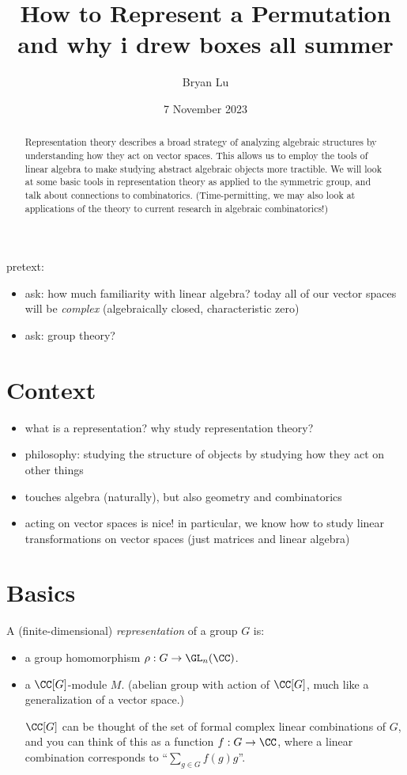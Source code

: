 \documentclass[12pt]{article}
\title{How to Represent a Permutation \\ \small{and why i drew boxes all summer}}
\author{Bryan Lu}
\date{7 November 2023} %
\begin{document}
\maketitle

\begin{abstract}
  Representation theory describes a broad strategy of analyzing
  algebraic structures by understanding how they act on vector spaces. This allows
  us to employ the tools of linear algebra to make studying abstract algebraic
  objects more tractible. We will
  look at some basic tools in representation theory as applied to the symmetric
  group, and talk about connections to combinatorics. (Time-permitting, we may also
  look at applications of the theory to current research in
  algebraic combinatorics!)
\end{abstract}

pretext: 
\begin{itemize}
  \item ask: how much familiarity with linear algebra? today all of our vector
    spaces will be \emph{complex} (algebraically closed, characteristic zero)  
  \item ask: group theory? 
\end{itemize}

\section{Context}
\begin{itemize}
  \item what is a representation? why study representation theory?
  \item philosophy: studying the structure of objects by studying how they act
    on other things
  \item touches algebra (naturally), but also geometry and combinatorics
  \item acting on vector spaces is nice! in particular, we know how to study
    linear transformations on vector spaces (just matrices and linear algebra)
\end{itemize}


\section{Basics}
\begin{definition*}
  A (finite-dimensional) \emph{representation} of a group $G$ is: 
\begin{itemize}
  \item a group homomorphism $\rho : G \to \GL_n(\CC)$.  
  \item a $\CC[G]$-module $M$. (abelian group with action of $\CC[G]$, much like
    a generalization of a vector space.)

    $\CC[G]$
    can be thought of the set of formal complex linear combinations of $G$,
    and you can think of this as a function $f : G \to \CC$, where a
    linear combination corresponds to ``$\sum_{g \in G} f(g) g$''. 
\end{itemize}
\end{definition*}
\end{document}
